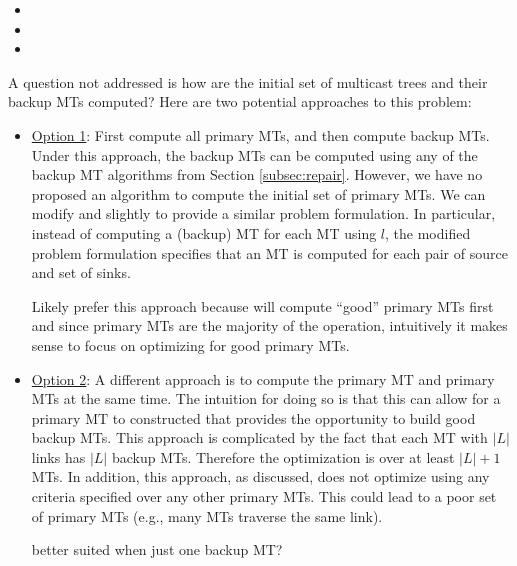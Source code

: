 \begin{framed}
\begin{itemize}
	\item {}

	\item {}

	\item {}
\end{itemize}
\end{framed}

A question not addressed is how are the initial set of multicast trees and their backup MTs computed?  
Here are two potential approaches to this problem:
\begin{itemize}
	\item \underline{Option 1}: First compute all primary MTs, and then compute backup MTs.  Under this approach, the backup MTs can be computed using any of the backup MT
algorithms from Section \ref{subsec:repair}.  However, we have no proposed an algorithm to compute the initial set of primary MTs. We can modify \mf and \md slightly to provide
a similar problem formulation.  In particular, instead of computing a (backup) MT for each MT using $l$, the modified problem formulation specifies that an MT is computed for each pair of source
and set of sinks. 

Likely prefer this approach because will compute ``good'' primary MTs first and since primary MTs are the majority of the operation, intuitively it makes sense to focus on optimizing
for good primary MTs.

	\item \underline{Option 2}: A different approach is to compute the primary MT and primary MTs at the same time.  The intuition for doing so is that this
can allow for a primary MT to constructed that provides the opportunity to build good backup MTs.  This approach is complicated by the fact that each MT with $|L|$ links has $|L|$ backup
MTs.  Therefore the optimization is over at least $|L|+1$ MTs.  In addition, this approach, as discussed, does not optimize using any criteria specified over any other primary MTs.  
This could lead to a poor set of primary MTs (e.g., many MTs traverse the same link). 

better suited when just one backup MT?
\end{itemize}


